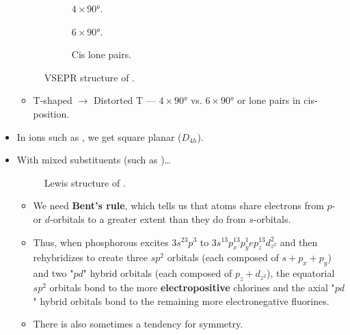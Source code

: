 \documentclass[../main.tex]{subfiles}
\begin{document}
\begin{itemize}
\begin{figure}[h!]
\begin{subfigure}[b]{0.2\linewidth}
            \centering
            \caption{$4\times\ang{90}$.}
            \label{fig:VSEPR-BrF3a}
        \end{subfigure}
        \begin{subfigure}[b]{0.2\linewidth}
            \centering
            \caption{$6\times\ang{90}$.}
            \label{fig:VSEPR-BrF3b}
        \end{subfigure}
        \begin{subfigure}[b]{0.2\linewidth}
            \centering
            \caption{Cis lone pairs.}
            \label{fig:VSEPR-BrF3c}
        \end{subfigure}
        \caption{VSEPR structure of .}
        \label{fig:VSEPR-BrF3}
    \end{figure}
    \begin{itemize}
        \item T-shaped $\to$ Distorted T --- $4\times\ang{90}$ vs. $6\times\ang{90}$ or lone pairs in cis-position.
    \end{itemize}
    \item In ions such as , we get square planar ($D_{4h}$).
    \item With mixed substituents (such as )\dots
    \begin{figure}[h!]
        \centering
        \caption{Lewis structure of .}
        \label{fig:Lewis-PF2Cl3}
    \end{figure}
    \begin{itemize}
        \item We need \textbf{Bent's rule}, which tells us that atoms share electrons from $p$- or $d$-orbitals to a greater extent than they do from $s$-orbitals.
        \item Thus, when phosphorous excites $3s^23p^3$ to $3s^13p_x^13p_y^1ep_z^13d_{z^2}^2$ and then rehybridizes to create three $sp^2$ orbitals (each composed of $s+p_x+p_y$) and two "$pd$" hybrid orbitals (each composed of $p_z+d_{z^2}$), the equatorial $sp^2$ orbitals bond to the more \textbf{electropositive} chlorines and the axial "$pd$" hybrid orbitals bond to the remaining more electronegative fluorines.
        \item There is also sometimes a tendency for symmetry.

\end{itemize}
\end{itemize}
\end{document}
